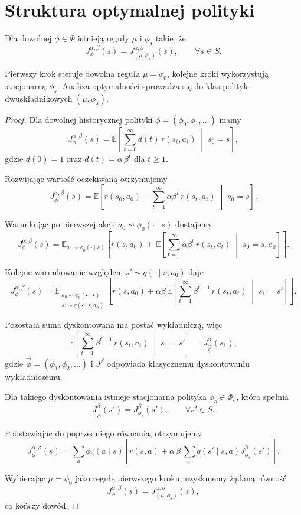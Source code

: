 \section{Struktura optymalnej polityki}

\begin{theorem}
\label{thm:policy-reduction}
Dla dowolnej $\phi \in \Phi$ istnieją reguły $\mu$ i $\phi_s$ takie, że
\[
  J_{\phi}^{\alpha,\beta}(s) = J_{(\mu,\phi_s)}^{\alpha,\beta}(s), \qquad \forall s \in S.
\]
\end{theorem}

Pierwszy krok steruje dowolna reguła $\mu = \phi_0$, kolejne kroki wykorzystują stacjonarną $\phi_s$. Analiza optymalności sprowadza się do klas polityk dwuskładnikowych $(\mu,\phi_s)$.

\begin{proof}
Dla dowolnej historycznej polityki $\phi = (\phi_0, \phi_1, \ldots)$ mamy
\[
  J_{\phi}^{\alpha,\beta}(s) = \mathbb{E}\!\left[ \sum_{t=0}^{\infty} d(t)\, r(s_t, a_t) \;\middle|\; s_0 = s \right],
\]
gdzie $d(0) = 1$ oraz $d(t) = \alpha\,\beta^{t}$ dla $t \ge 1$.

Rozwijając wartość oczekiwaną otrzymujemy
\[
  J_{\phi}^{\alpha,\beta}(s) = \mathbb{E}\!\left[ r(s_0,a_0) + \sum_{t=1}^{\infty} \alpha \beta^{t}\, r(s_t,a_t) \;\middle|\; s_0 = s \right].
\]

Warunkując po pierwszej akcji $a_0 \sim \phi_0(\cdot \mid s)$ dostajemy
\[
  J_{\phi}^{\alpha,\beta}(s) = \mathbb{E}_{a_0 \sim \phi_0(\cdot \mid s)}\!\left[ r(s,a_0) + \,\mathbb{E}\!\left[ \sum_{t=1}^{\infty} \alpha \beta^{t}\, r(s_t,a_t) \;\middle|\; s_0 = s, a_0 \right] \right].
\]

Kolejne warunkowanie względem $s' \sim q(\cdot \mid s,a_0)$ daje
\[
  J_{\phi}^{\alpha,\beta}(s) = \mathbb{E}_{\substack{a_0 \sim \phi_0(\cdot \mid s) \\ s' \sim q(\cdot \mid s,a_0)}}\!\left[ r(s,a_0) + \alpha\beta\,\mathbb{E}\!\left[ \sum_{t=1}^{\infty} \beta^{t-1}\, r(s_t,a_t) \;\middle|\; s_1=s' \right] \right].
\]

Pozostała suma dyskontowana ma postać wykładniczą, więc
\[
  \mathbb{E}\!\left[ \sum_{t=1}^{\infty} \beta^{t-1}\, r(s_t,a_t) \;\middle|\; s_1 = s' \right] = \,J_{\overrightarrow{\phi}}^{\beta}(s_1),
\]
gdzie $\overrightarrow{\phi} = (\phi_1, \phi_2, \ldots)$ i $J^{\beta}$ odpowiada klasycznemu dyskontowaniu wykładniczemu.

Dla takiego dyskontowania istnieje stacjonarna polityka $\phi_s \in \Phi_s$, która spełnia
\[
  J^{\beta}_{\overrightarrow{\phi}}(s') = J^{\beta}_{\phi_s}(s'), \qquad \forall s' \in S.
\]

Podstawiając do poprzedniego równania, otrzymujemy
\[
  J_{\phi}^{\alpha,\beta}(s) = \sum_{a}\phi_{0}(a \mid s)\!\left[ r(s,a) + \alpha\,\beta\, \sum_{s'} q(s' \mid s,a) J^{\beta}_{\phi_s}(s') \right].
\]

Wybierając $\mu = \phi_0$ jako regułę pierwszego kroku, uzyskujemy żądaną równość
\[
  J_{\phi}^{\alpha,\beta}(s) = J_{(\mu,\phi_s)}^{\alpha,\beta}(s), 
\]
co kończy dowód.
\end{proof}

